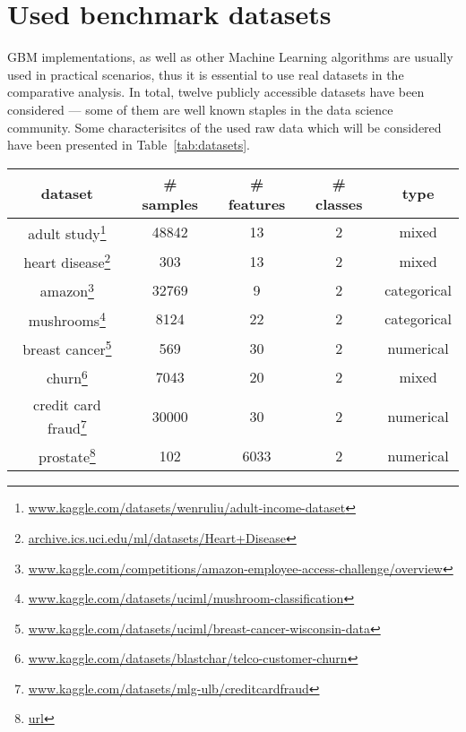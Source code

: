 \documentclass[magisterska, english]{pwr_wmat_praca_dyplomowa}
\theoremstyle{plain}
\numberwithin{theorem}{chapter}
\theoremstyle{definition}
\numberwithin{theorem}{chapter}
\begin{document}
\section{Used benchmark datasets}\label{section:real_datasets}
GBM implementations, as well as other Machine Learning algorithms are usually used in practical scenarios, thus it is essential to use real datasets in the comparative analysis. In total, twelve publicly accessible datasets have been considered --- some of them are well known staples in the data science community. Some characterisitcs of the used raw data which will be considered have been presented in Table~\ref{tab:datasets}.
\newpage
\begin{table}[h!] %
\centering
\begin{tabular}{|c|c|c|c|c|}
\hline
\textbf{dataset}  & \textbf{\# samples} & \textbf{\# features} & \textbf{\# classes} & \textbf{type} \\ \hline
adult study\footnote{\url{www.kaggle.com/datasets/wenruliu/adult-income-dataset}}       & 48842              & 13                  & 2                  & mixed         \\ \hline
heart disease\footnote{\url{archive.ics.uci.edu/ml/datasets/Heart+Disease}}     & 303                & 13                  & 2                  & mixed         \\ \hline
amazon\footnote{\url{www.kaggle.com/competitions/amazon-employee-access-challenge/overview}}            & 32769              & 9                   & 2                  & categorical   \\ \hline
mushrooms\footnote{\url{www.kaggle.com/datasets/uciml/mushroom-classification}}           & 8124               & 22                  & 2                  & categorical   \\ \hline
breast cancer\footnote{\url{www.kaggle.com/datasets/uciml/breast-cancer-wisconsin-data}}     & 569                & 30                  & 2                  & numerical     \\ \hline
churn\footnote{\url{www.kaggle.com/datasets/blastchar/telco-customer-churn}}             & 7043               & 20                  & 2                  & mixed         \\ \hline
credit card fraud\footnote{\url{www.kaggle.com/datasets/mlg-ulb/creditcardfraud}} & 30000              & 30                  & 2                  & numerical     \\ \hline
prostate\footnote{\url{url}}          & 102                & 6033                & 2                  & numerical     \\ \hline

\end{tabular}
\end{table}
\end{document}
